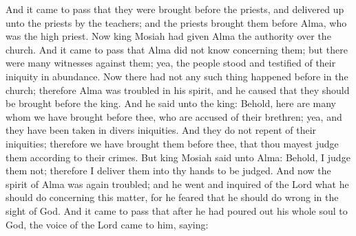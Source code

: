 And it came to pass that they were brought before the priests, and delivered up unto the priests by the teachers; and the priests brought them before Alma, who was the high priest.
\bverse \iffalse Now king Mosiah had given Alma the authority over the church. \fi
Now king Mosiah had given Alma the authority over the church.
\bverse \iffalse And it came to pass that Alma did not know concerning them; but there were many witnesses against them; yea, the people stood and testified of their iniquity in abundance. \fi
And it came to pass that Alma did not know concerning them; but there were many witnesses against them; yea, the people stood and testified of their iniquity in abundance.
\bverse \iffalse Now there had not any such thing happened before in the church; therefore Alma was troubled in his spirit, and he caused that they should be brought before the king. \fi
Now there had not any such thing happened before in the church; therefore Alma was troubled in his spirit, and he caused that they should be brought before the king.
\bverse \iffalse And he said unto the king: Behold, here are many whom we have brought before thee, who are accused of their brethren; yea, and they have been taken in divers iniquities. And they do not repent of their iniquities; therefore we have brought them before thee, that thou mayest judge them according to their crimes. \fi
And he said unto the king: Behold, here are many whom we have brought before thee, who are accused of their brethren; yea, and they have been taken in divers iniquities. And they do not repent of their iniquities; therefore we have brought them before thee, that thou mayest judge them according to their crimes.
\bverse \iffalse But king Mosiah said unto Alma: Behold, I judge them not; therefore I deliver them into thy hands to be judged. \fi
But king Mosiah said unto Alma: Behold, I judge them not; therefore I deliver them into thy hands to be judged.
\bverse \iffalse And now the spirit of Alma was again troubled; and he went and inquired of the Lord what he should do concerning this matter, for he feared that he should do wrong in the sight of God. \fi
And now the spirit of Alma was again troubled; and he went and inquired of the Lord what he should do concerning this matter, for he feared that he should do wrong in the sight of God.
\bverse \iffalse And it came to pass that after he had poured out his whole soul to God, the voice of the Lord came to him, saying: \fi
And it came to pass that after he had poured out his whole soul to God, the voice of the Lord came to him, saying:
